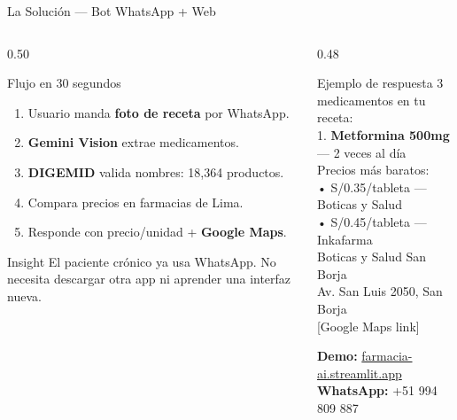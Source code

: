\documentclass[aspectratio=169,11pt]{beamer}
\newcommand{\tightlist}{\setlength\itemsep{2pt}\setlength\parskip{0pt}\setlength\parsep{0pt}}
\begin{document}
\begin{frame}[t]{La Solución — Bot WhatsApp + Web}
\vspace{-0.2em}
\begin{columns}[T,onlytextwidth]
\begin{column}{0.50\textwidth}
\begin{block}{Flujo en 30 segundos}
\begin{enumerate}\tightlist
  \item Usuario manda \textbf{foto de receta} por WhatsApp.
  \item \textbf{Gemini Vision} extrae medicamentos.
  \item \textbf{DIGEMID} valida nombres: 18,364 productos.
  \item Compara precios en farmacias de Lima.
  \item Responde con precio/unidad + \textbf{Google Maps}.
\end{enumerate}
\end{block}
\vspace{0.35em}
\begin{block}{Insight}
El paciente crónico ya usa WhatsApp. No necesita descargar otra app ni aprender una interfaz nueva.
\end{block}
\end{column}
\begin{column}{0.48\textwidth}
\begin{alertblock}{Ejemplo de respuesta}
{\ttfamily\scriptsize
3 medicamentos en tu receta:\\[1pt]
1. \textbf{Metformina 500mg} — 2 veces al día\\[2pt]
Precios más baratos:\\
• S/0.35/tableta — Boticas y Salud\\
• S/0.45/tableta — Inkafarma\\[2pt]
Boticas y Salud San Borja\\
Av. San Luis 2050, San Borja\\
{[Google Maps link]}}
\end{alertblock}
\vspace{0.25em}
{\scriptsize\textbf{Demo:} \url{farmacia-ai.streamlit.app}\\\textbf{WhatsApp:} +51 994 809 887}
\end{column}
\end{columns}
\end{frame}
\end{document}
